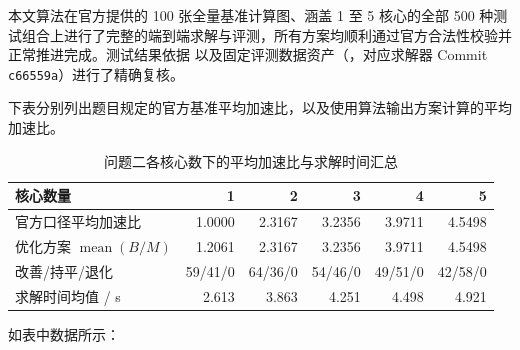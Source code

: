 \documentclass[anonymous,withtoc]{gmcm2026}
\begin{document}
本文算法在官方提供的 100 张全量基准计算图、涵盖 1 至 5 核心的全部 500 种测试组合上进行了完整的端到端求解与评测，所有方案均顺利通过官方合法性校验并正常推进完成。测试结果依据 \texttt{} 以及固定评测数据资产（\texttt{}，对应求解器 Commit \texttt{c66559a}）进行了精确复核。

下表分别列出题目规定的官方基准平均加速比，以及使用算法输出方案计算的平均加速比。



\begin{table}[!htbp]\centering
\caption{问题二各核心数下的平均加速比与求解时间汇总}\label{tab:05-p2-1}\normalsize

\begin{tabularx}{\linewidth}{@{}Xrrrrr@{}}\toprule
核心数量 & 1 & 2 & 3 & 4 & 5 \\
\midrule
官方口径平均加速比 & 1.0000 & 2.3167 & 3.2356 & 3.9711 & 4.5498 \\
优化方案 $\operatorname{mean}(B/M)$ & 1.2061 & 2.3167 & 3.2356 & 3.9711 & 4.5498 \\
改善/持平/退化 & 59/41/0 & 64/36/0 & 54/46/0 & 49/51/0 & 42/58/0 \\
求解时间均值 / s & 2.613 & 3.863 & 4.251 & 4.498 & 4.921 \\
\bottomrule\end{tabularx}\end{table}

如表中数据所示：
\end{document}
